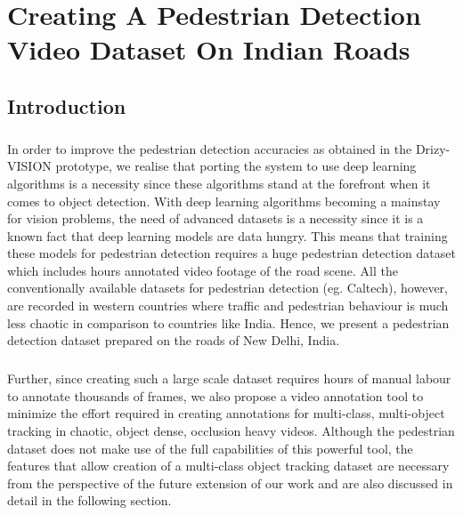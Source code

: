 \chapter{Creating A Pedestrian Detection Video Dataset On Indian Roads}
\section{Introduction}
\paragraph{} In order to improve the pedestrian detection accuracies as obtained in the Drizy-VISION prototype, we realise that porting the system to use deep learning algorithms is a necessity since these algorithms stand at the forefront when it comes to object detection. With deep learning algorithms becoming a mainstay for vision problems, the need of advanced datasets is a necessity since it is a known fact that deep learning models are data hungry. This means that training these models for pedestrian detection requires a huge pedestrian detection dataset which includes hours annotated video footage of the road scene. All the conventionally available datasets for pedestrian detection (eg. Caltech), however, are recorded in western countries where traffic and pedestrian behaviour is much less chaotic in comparison to countries like India. Hence, we present a pedestrian detection dataset prepared on the roads of New Delhi, India. 
\paragraph{}Further, since creating such a large scale dataset requires hours of manual labour to annotate thousands of frames, we also propose a video annotation tool to minimize the effort required in creating annotations for multi-class, multi-object tracking in chaotic, object dense, occlusion heavy videos. Although the pedestrian dataset does not make use of the full capabilities of this powerful tool, the features that allow creation of a multi-class object tracking dataset are necessary from the perspective of the future extension of our work and are also discussed in detail in the following section. 

